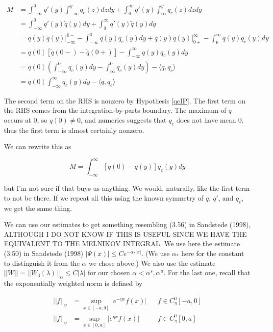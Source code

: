 \documentclass[12pt]{article}
\begin{document}
\begin{align*}
M &= \int_{-\infty}^0 q'(y) \int_{-\infty}^y q_c(z) dz dy + \int_0^\infty q'(y) \int_{\infty}^y q_c(z) dz dy \\
&= \int_{-\infty}^0 q'(y) \tilde{q}(y) dy + \int_0^\infty q'(y) \tilde{q}(y) dy \\
&= q(y) \tilde{q}(y)\Big|_{-\infty}^{0-} - \int_{-\infty}^0 q(y) q_c (y) dy + q(y) \tilde{q}(y)\Big|_{0+}^{\infty} - \int_0^{\infty} q(y) q_c (y) dy \\
&= q(0)[\tilde{q}(0-) - \tilde{q}(0+)] - \int_{-\infty}^\infty q(y) q_c(y) dy \\
&= q(0)\left( \int_{-\infty}^0 q_c(y) dy - \int_{\infty}^0 q_c(y) dy \right) - \langle q, q_c \rangle \\
&= q(0) \int_{-\infty}^\infty q_c(y) dy - \langle q, q_c \rangle
\end{align*}

The second term on the RHS is nonzero by Hypothesis \ref{qcIP}. The first term on the RHS comes from the integration-by-parts boundary. The maximum of $q$ occurs at 0, so $q(0) \neq 0$, and numerics suggests that $q_c$ does not have mean 0, thus the first term is almost certainly nonzero.

We can rewrite this as

\begin{equation}
M = \int_{-\infty}^\infty [q(0) - q(y)] q_c(y) dy
\end{equation}

but I'm not sure if that buys us anything. We would, naturally, like the first term to not be there. If we repeat all this using the known symmetry of $q$, $q'$, and $q_c$, we get the same thing.

We can use our estimates to get something resembling (3.56) in Sandstede (1998), ALTHOUGH I DO NOT KNOW IF THIS IS USEFUL SINCE WE HAVE THE EQUIVALENT TO THE MELNIKOV INTEGRAL. We use here the estimate (3.50) in Sandstede (1998) $|\Psi(x)| \leq C e^{-\alpha_* |x|}$. (We use $\alpha_*$ here for the constant to distinguish it from the $\alpha$ we chose above.) We also use the estimate $||W|| = ||W_3(\lambda)||_\alpha \leq C|\lambda|$ for our chosen $\alpha < \alpha^s, \alpha^u$. For the last one, recall that the exponentially weighted norm is defined by

\begin{align*}
|| f ||_\eta &= \sup_{x \in [-a, 0]} |e^{-\eta x} f(x) | && f \in C^0_\eta[-a, 0] \\
|| f ||_\eta &= \sup_{x \in [0, a]} |e^{\eta x} f(x) | && f \in C^0_\eta[0, a] \\
\end{align*}
\end{document}
